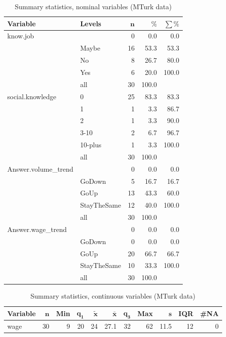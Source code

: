 \documentclass[a4paper,10pt]{article}\usepackage[]{graphicx}\usepackage[]{color}
\begin{document}
\begin{table}[ht]
\centering
{\footnotesize
\begin{tabular}{ll|rrr}
 \textbf{Variable} & \textbf{Levels} & $\mathbf{n}$ & $\mathbf{\%}$ & $\mathbf{\sum \%}$ \\ 
  \hline
know.job &  & 0 & 0.0 & 0.0 \\ 
   & Maybe & 16 & 53.3 & 53.3 \\ 
   & No & 8 & 26.7 & 80.0 \\ 
   & Yes & 6 & 20.0 & 100.0 \\ 
   \hline
 & all & 30 & 100.0 &  \\ 
   \hline
\hline
social.knowledge & 0 & 25 & 83.3 & 83.3 \\ 
   & 1 & 1 & 3.3 & 86.7 \\ 
   & 2 & 1 & 3.3 & 90.0 \\ 
   & 3-10 & 2 & 6.7 & 96.7 \\ 
   & 10-plus & 1 & 3.3 & 100.0 \\ 
   \hline
 & all & 30 & 100.0 &  \\ 
   \hline
\hline
Answer.volume\_trend &  & 0 & 0.0 & 0.0 \\ 
   & GoDown & 5 & 16.7 & 16.7 \\ 
   & GoUp & 13 & 43.3 & 60.0 \\ 
   & StayTheSame & 12 & 40.0 & 100.0 \\ 
   \hline
 & all & 30 & 100.0 &  \\ 
   \hline
\hline
Answer.wage\_trend &  & 0 & 0.0 & 0.0 \\ 
   & GoDown & 0 & 0.0 & 0.0 \\ 
   & GoUp & 20 & 66.7 & 66.7 \\ 
   & StayTheSame & 10 & 33.3 & 100.0 \\ 
   \hline
 & all & 30 & 100.0 &  \\ 
   \hline
\hline
\end{tabular}
}
\caption{Summary statistics, nominal variables (MTurk data)} 
\label{tab1:17-3020}
\end{table}
\begin{table}[ht]
\centering
{\footnotesize
\begin{tabular}{lrrrrrrrrrr}
 \textbf{Variable} & $\mathbf{n}$ & \textbf{Min} & $\mathbf{q_1}$ & $\mathbf{\widetilde{x}}$ & $\mathbf{\bar{x}}$ & $\mathbf{q_3}$ & \textbf{Max} & $\mathbf{s}$ & \textbf{IQR} & \textbf{\#NA} \\ 
  \hline
wage & 30 & 9 & 20 & 24 & 27.1 & 32 & 62 & 11.5 & 12 & 0 \\ 
  \end{tabular}
}
\caption{Summary statistics, continuous variables (MTurk data)} 
\label{tab2:17-3020}
\end{table}
\end{document}
